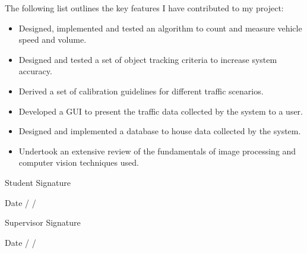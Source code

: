 \begin{contributions}
The following list outlines the key features I have contributed to my project:

\begin{itemize}
    \item Designed, implemented and tested an algorithm to count and measure vehicle speed and volume.
    \item Designed and tested a set of object tracking criteria to increase system accuracy.
    \item Derived a set of calibration guidelines for different traffic scenarios.
    \item Developed a GUI to present the traffic data collected by the system to a user.
    \item Designed and implemented a database to house data collected by the system.
    \item Undertook an extensive review of the fundamentals of image processing and computer vision techniques used.  
\end{itemize}

  \vskip 0.5in 
  \normalsize {Student Signature \underline{\hspace{1.5in}}}
  
  \vskip 0.1in
  \normalsize {Date \underline{\hspace{0.5in}} / \underline{\hspace{0.5in}} / \underline{\hspace{0.5in}}}

  \vskip 0.5in 
  \normalsize {Supervisor Signature \underline{\hspace{1.5in}}}
  
  \vskip 0.1in
  \normalsize {Date \underline{\hspace{0.5in}} / \underline{\hspace{0.5in}} / \underline{\hspace{0.5in}}}
  

\end{contributions}